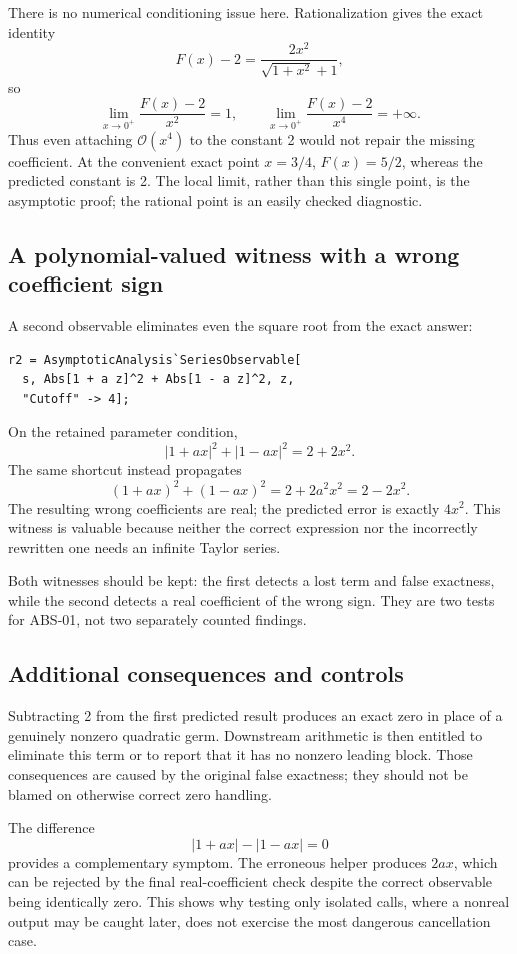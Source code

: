 \documentclass[11pt]{article}
\newcommand{\code}[1]{\texttt{\detokenize{#1}}}
\newcommand{\OO}{\mathcal O}
\theoremstyle{remark}\newtheorem{remark}[theorem]{Remark}
\begin{document}
There is no numerical conditioning issue here. Rationalization gives the exact
identity
\[
 F(x)-2=\frac{2x^2}{\sqrt{1+x^2}+1},
\]
so
\[
 \lim_{x\to0^+}\frac{F(x)-2}{x^2}=1,
 \qquad
 \lim_{x\to0^+}\frac{F(x)-2}{x^4}=+\infty.
\]
Thus even attaching \(\OO(x^4)\) to the constant 2 would not repair the missing
coefficient. At the convenient exact point \(x=3/4\), \(F(x)=5/2\), whereas the
predicted constant is 2. The local limit, rather than this single point, is the
asymptotic proof; the rational point is an easily checked diagnostic.

\subsection{A polynomial-valued witness with a wrong coefficient sign}
A second observable eliminates even the square root from the exact answer:
\begin{lstlisting}
r2 = AsymptoticAnalysis`SeriesObservable[
  s, Abs[1 + a z]^2 + Abs[1 - a z]^2, z,
  "Cutoff" -> 4];
\end{lstlisting}
On the retained parameter condition,
\[
 |1+ax|^2+|1-ax|^2=2+2x^2.
\]
The same shortcut instead propagates
\[
 (1+ax)^2+(1-ax)^2=2+2a^2x^2=2-2x^2.
\]
The resulting wrong coefficients are real; the predicted error is exactly
\(4x^2\). This witness is valuable because neither the correct expression nor
the incorrectly rewritten one needs an infinite Taylor series.

Both witnesses should be kept: the first detects a lost term and false
exactness, while the second detects a real coefficient of the wrong sign.
They are two tests for ABS-01, not two separately counted findings.

\subsection{Additional consequences and controls}
Subtracting 2 from the first predicted result produces an exact zero in place
of a genuinely nonzero quadratic germ. Downstream arithmetic is then entitled
to eliminate this term or to report that it has no nonzero leading block.
Those consequences are caused by the original false exactness; they should
not be blamed on otherwise correct zero handling.

The difference
\[
 |1+ax|-|1-ax|=0
\]
provides a complementary symptom. The erroneous helper produces \(2ax\), which
can be rejected by the final real-coefficient check despite the correct
observable being identically zero. This shows why testing only isolated
\code{Abs} calls, where a nonreal output may be caught later, does not exercise
the most dangerous cancellation case.
\end{document}
